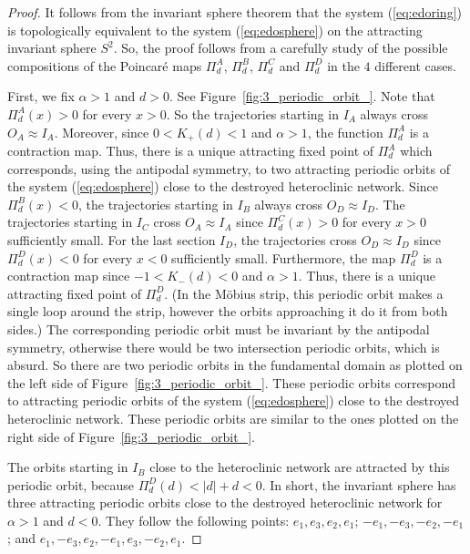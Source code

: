 \documentclass{article}
\theoremstyle{definition}
\begin{document}
\begin{proof}

It follows from the invariant sphere theorem that the system (\ref{eq:edoring}) is topologically equivalent to the system (\ref{eq:edosphere}) on the attracting invariant sphere $S^2$. 
So, the proof follows from a carefully study of the possible compositions of the Poincaré maps $\Pi^{A}_{d}$, $\Pi^{B}_{d}$, $\Pi^{C}_{d}$ and $\Pi^{D}_{d}$ in the $4$  different cases. 

First, we fix $\alpha>1$ and $d>0$.
See Figure~\ref{fig:3_periodic_orbit_}.
Note that  $\Pi^{A}_{d}(x)>0$ for every $x>0$. 
So the trajectories starting in $I_A$ always cross $O_A\approx I_A$.
Moreover, since $0<K_+(d)<1$ and $\alpha>1$, the function $\Pi^{A}_{d}$ is a contraction map. 
Thus, there is a unique attracting fixed point of $\Pi^{A}_{d}$ which corresponds, using the antipodal symmetry, to two attracting periodic orbits of the system (\ref{eq:edosphere}) close to the destroyed heteroclinic network.
Since $\Pi^{B}_{d}(x)<0$, the trajectories starting in $I_B$ always cross $O_D\approx I_D$.
The trajectories starting in $I_C$ cross $O_A\approx I_A$ since $\Pi^{C}_{d}(x)>0$ for every $x>0$ sufficiently small. 
For the last section $I_D$, the trajectories cross $O_D\approx I_D$ since $\Pi^{D}_{d}(x)<0$ for every $x<0$ sufficiently small.
Furthermore, the map $\Pi^{D}_{d}$ is a contraction map since $-1<K_-(d)<0$ and $\alpha>1$.
Thus, there is a unique attracting fixed point of $\Pi^{D}_{d}$.
(In the Möbius strip, this periodic orbit makes a single loop around the strip, however the orbits approaching it do it from both sides.)
The corresponding periodic orbit  must be invariant by the antipodal symmetry, otherwise there would be two intersection periodic orbits, which is absurd. 
So there are two periodic orbits in the fundamental domain as plotted on the left side of Figure~\ref{fig:3_periodic_orbit_}.
These periodic orbits correspond to attracting periodic orbits of the system (\ref{eq:edosphere}) close to the destroyed heteroclinic network.
These periodic orbits are similar to the ones plotted on the right side of Figure~\ref{fig:3_periodic_orbit_}.

The orbits starting in $I_B$ close to the heteroclinic network are attracted by this periodic orbit, because $\Pi^{D}_{d}(d)<|d|+d<0$.
In short, the invariant sphere has three attracting periodic orbits close to the destroyed heteroclinic network for $\alpha>1$ and $d<0$. They follow the following points: $e_1, e_3,e_2, e_1$; $-e_1, -e_3,-e_2, -e_1$; and $e_1, -e_3, e_2, -e_1, e_3, -e_2, e_1$.


\end{proof}
\end{document}
